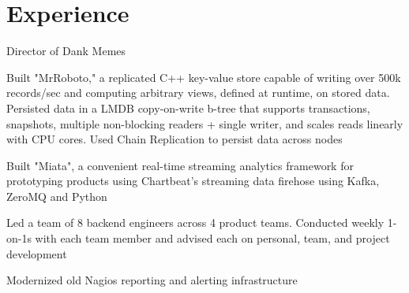 \documentclass[]{resume-openfont}
\begin{document}
{}

\section{Experience}
    \begin{tightemize}
        \item
            Director of Dank Memes
    \end{tightemize}

    \begin{tightemize}
        \item
            Built "MrRoboto," a replicated C++ key-value store capable of
            writing over 500k records/sec and computing arbitrary views,
            defined at runtime, on stored data. Persisted data in a LMDB
            copy-on-write b-tree that supports transactions, snapshots,
            multiple non-blocking readers + single writer, and scales reads
            linearly with CPU cores. Used Chain Replication to persist data
            across nodes
        \item
            Built "Miata", a convenient real-time streaming analytics framework
            for prototyping products using Chartbeat's streaming data firehose
            using Kafka, ZeroMQ and Python
        \item
            Led a team of 8 backend engineers across 4 product teams. Conducted
            weekly 1-on-1s with each team member and advised each on personal,
            team, and project development
        \item
            Modernized old Nagios reporting and alerting infrastructure
    \end{tightemize}
    \vspace{5pt}
\end{document}
